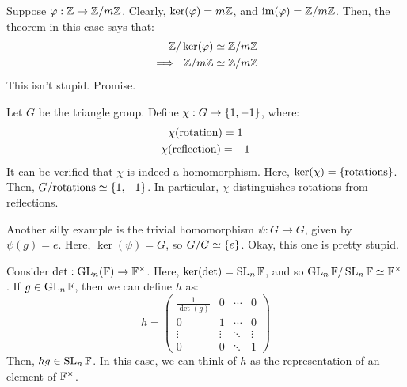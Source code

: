 \begin{xmp}[source=Primary Source Material]
    Suppose $ \operatorname{\varphi} : \mathbb{Z} \rightarrow \mathbb{Z}/m\mathbb{Z} $. \vsp
    Clearly, $ \ker(\operatorname{\varphi}) = m\mathbb{Z} $, and $ \operatorname{im}(\operatorname{\varphi}) = \mathbb{Z}/m\mathbb{Z} $.
    Then, the theorem in this case says that:
    \begin{align*}
        \mathbb{Z}/\ker(\operatorname{\varphi}) & \simeq \mathbb{Z}/m\mathbb{Z} \\
        \implies \ \mathbb{Z}/m\mathbb{Z} & \simeq \mathbb{Z}/m\mathbb{Z}
    \end{align*}
    This isn't stupid. Promise.
\end{xmp}

\begin{xmp}[source=Primary Source Material]
    Let $ G $ be the triangle group.
    Define $ \chi : G \rightarrow \left\{{1, -1}\right\} $, where:
    \begin{gather*}
        \chi(\textrm{rotation}) = 1 \\
        \chi(\textrm{reflection}) = -1
    \end{gather*}
    It can be verified that $ \chi $ is indeed a homomorphism.
    Here, $ \ker(\chi) = \left\{{\textrm{rotations}}\right\} $.
    Then, $ G/\textrm{rotations} \simeq \left\{{1, -1}\right\} $.
    In particular, $ \chi $ distinguishes rotations from reflections.
\end{xmp}

\begin{xmp}[source=Primary Source Material]
    Another silly example is the trivial homomorphism $ \psi : G \rightarrow G $,
    given by $ \psi(g) = e $. \vsp
    Here, $ \ker(\psi) = G $, so $ G/G \simeq \left\{{e}\right\} $. Okay, this one is pretty stupid.
\end{xmp}

\begin{xmp}[source=Primary Source Material]
    Consider $ \det : \operatorname{GL}_{n}(\mathbb{F}) \rightarrow \mathbb{F}^{\times} $.
    Here, $ \ker(\det) = \operatorname{SL}_{n}\mathbb{F} $, and so
    $ \operatorname{GL}_{n}\mathbb{F}/\operatorname{SL}_{n}\mathbb{F} \simeq \mathbb{F}^{\times} $. \vsp%
    If $ g \in \operatorname{GL}_{n}\mathbb{F} $, then we can define $ h $ as:
    \begin{equation*}
        h = \begin{pmatrix} 
            \frac{1}{\det(g)} & 0 & \cdots & 0 \\
            0 & 1 & \cdots & 0 \\
            \vdots & \vdots & \ddots & \vdots \\
            0 & 0 & \ddots & 1
        \end{pmatrix}
    \end{equation*}
    Then, $ hg \in \operatorname{SL}_{n}\mathbb{F} $.
    In this case, we can think of $ h $ as the representation of an element of $ \mathbb{F}^{\times} $.
\end{xmp}

